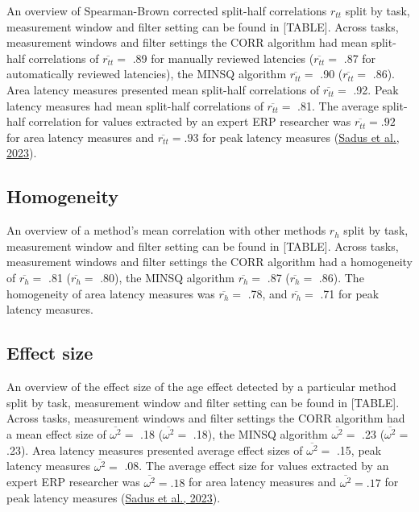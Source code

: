 \documentclass[
  man]{apa7}
\begin{document}
An overview of Spearman-Brown corrected split-half correlations \(r_{tt}\) split by task, measurement window and filter setting can be found in {[}TABLE{]}. Across tasks, measurement windows and filter settings the CORR algorithm had mean split-half correlations of \(\overline{r_{tt}} =\) .89 for manually reviewed latencies (\(\overline{r_{tt}} =\) .87 for automatically reviewed latencies), the MINSQ algorithm \(\overline{r_{tt}} =\) .90 (\(\overline{r_{tt}} =\) .86). Area latency measures presented mean split-half correlations of \(\overline{r_{tt}} =\) .92. Peak latency measures had mean split-half correlations of \(\overline{r_{tt}} =\) .81. The average split-half correlation for values extracted by an expert ERP researcher was \(\overline{r_{tt}} = .92\) for area latency measures and \(\overline{r_{tt}} = .93\) for peak latency measures (\protect\hyperlink{ref-sadus2023multiverse}{Sadus et al., 2023}).

\hypertarget{homogeneity}{%
\subsection{Homogeneity}\label{homogeneity}}

An overview of a method's mean correlation with other methods \(r_h\) split by task, measurement window and filter setting can be found in {[}TABLE{]}. Across tasks, measurement windows and filter settings the CORR algorithm had a homogeneity of \(\overline{r_{h}} =\) .81 (\(\overline{r_{h}} =\) .80), the MINSQ algorithm \(\overline{r_{h}} =\) .87 (\(\overline{r_{h}} =\) .86). The homogeneity of area latency measures was \(\overline{r_{h}} =\) .78, and \(\overline{r_{h}} =\) .71 for peak latency measures.

\hypertarget{effect-size}{%
\subsection{Effect size}\label{effect-size}}

An overview of the effect size of the age effect detected by a particular method split by task, measurement window and filter setting can be found in {[}TABLE{]}. Across tasks, measurement windows and filter settings the CORR algorithm had a mean effect size of \(\overline{\omega^2} =\) .18 (\(\overline{\omega^2} =\) .18), the MINSQ algorithm \(\overline{\omega^2} =\) .23 (\(\overline{\omega^2} =\) .23). Area latency measures presented average effect sizes of \(\overline{\omega^2} =\) .15, peak latency measures \(\overline{\omega^2} =\) .08. The average effect size for values extracted by an expert ERP researcher was \(\overline{\omega^2} = .18\) for area latency measures and \(\overline{\omega^2} = .17\) for peak latency measures (\protect\hyperlink{ref-sadus2023multiverse}{Sadus et al., 2023}).
\end{document}
